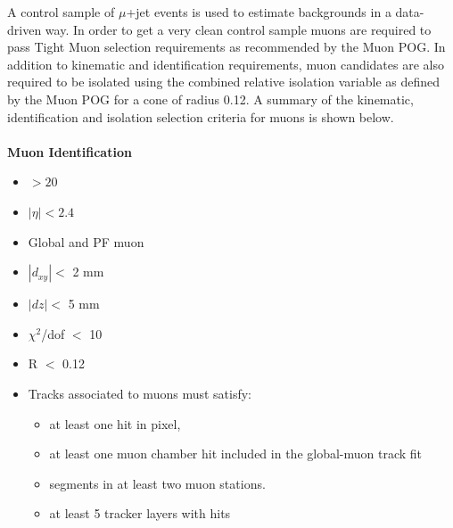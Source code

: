 A control sample of $\mu$+jet events is used to estimate backgrounds in a data-driven way. 
In order to get a very clean control sample muons are required to pass Tight Muon selection requirements as recommended by the Muon POG. 
In addition to kinematic and identification requirements, muon candidates are also required to be isolated using the combined relative isolation variable as defined by the Muon POG for a cone of radius 0.12.%
A summary of the kinematic, identification and isolation selection criteria for muons is shown below.\\ \\
{\bf Muon Identification}
\begin{itemize}
\item \pt $> 20$ \GeV
\item $|\eta|< 2.4$
\item Global and PF muon
\item $|d_{xy}| <$ 2 mm
\item $|dz| < $ 5 mm
\item $\chi^{2}$/dof $<$ 10
\item R $<$ 0.12
\item Tracks associated to muons must satisfy:
\begin{itemize}
\item at least one hit in pixel,
\item at least one muon chamber hit included in the global-muon track fit
\item segments in at least two muon stations.
\item at least 5 tracker layers with hits
\end{itemize}
\end{itemize}


